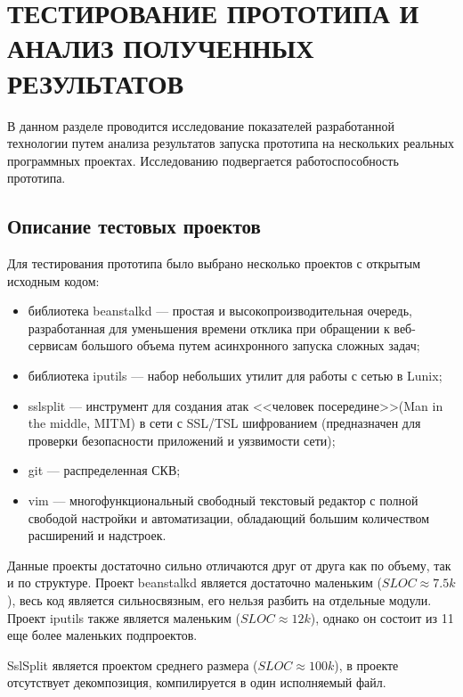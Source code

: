 \chapter{ТЕСТИРОВАНИЕ ПРОТОТИПА И АНАЛИЗ ПОЛУЧЕННЫХ РЕЗУЛЬТАТОВ}
\label{chapter:testing}
В данном разделе проводится исследование показателей разработанной технологии путем анализа результатов запуска прототипа на нескольких реальных программных проектах. Исследованию подвергается работоспособность прототипа.

\section{Описание тестовых проектов}
Для тестирования прототипа было выбрано несколько проектов с открытым исходным кодом:
\begin{itemize}
\item библиотека beanstalkd --- простая и высокопроизводительная очередь, разработанная для уменьшения времени отклика при обращении к веб-сервисам большого объема путем асинхронного запуска сложных задач;
\item библиотека iputils --- набор небольших утилит для работы с сетью в Lunix;
\item sslsplit --- инструмент для создания атак <<человек посередине>>(Man in the middle, MITM) в сети с SSL/TSL шифрованием (предназначен для проверки безопасности приложений и уязвимости сети);
\item git --- распределенная СКВ;
\item vim ---  многофункциональный свободный текстовый редактор с полной свободой настройки и автоматизации, обладающий большим количеством расширений и надстроек.
\end{itemize}

Данные проекты достаточно сильно отличаются друг от друга как по объему, так и по структуре. Проект beanstalkd является достаточно маленьким ($SLOC \approx 7.5k$), весь код является сильносвязным, его нельзя разбить на отдельные модули. Проект iputils также является маленьким ($SLOC \approx 12k$), однако он состоит из 11 еще более маленьких подпроектов.

SslSplit является проектом среднего размера ($SLOC \approx 100k$), в проекте отсутствует декомпозиция, компилируется в один исполняемый файл.

